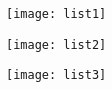 \documentclass[russian,utf8, a1paper]{eskdgraph}
\begin{document}
\begin{ESKDdrawing}

\texttt{[image: list1]}

\end{ESKDdrawing}

\begin{ESKDdrawing}
\texttt{[image: list2]}
\end{ESKDdrawing}

\begin{ESKDdrawing}
\texttt{[image: list3]}
\end{ESKDdrawing}
\end{document}

